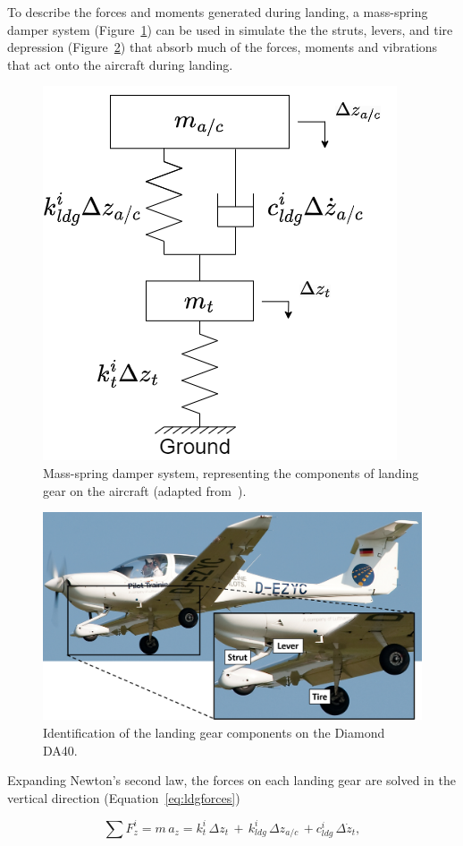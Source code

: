 To describe the forces and moments generated during landing, a mass-spring damper system (Figure~\ref{fig:ldgfbd}) can be used in simulate the the struts, levers, and tire depression (Figure~\ref{fig:ldg}) that absorb much of the forces, moments and vibrations that act onto the aircraft during landing.

\begin{figure}[!ht]\label{fig:ldgfbd}
    \centering
    \includegraphics[width=.4\linewidth]{Figures/ldgfbd.drawio.png}
    \caption{Mass-spring damper system, representing the components of landing gear on the aircraft (adapted from~\cite{xingStrengthAnalysisDiagonal2012}).}
\end{figure}

\begin{figure}[!ht]\label{fig:ldg}
    \centering
    \includegraphics[width=.75\linewidth]{Figures/LandingGear.png}
    \caption{Identification of the landing gear components on the Diamond DA40.}
\end{figure}

Expanding Newton's second law, the forces on each landing gear are solved in the vertical direction (Equation~\ref{eq:ldgforces})

\begin{equation}
    \sum F^i_z = m\,a_z = k^i_t\, \Delta z_t\, + \, k^i_{ldg}\, \Delta z_{a/c}\, + c^i_{ldg}\, \Delta \dot{z}_t,
    \label{eq:ldgforces}
\end{equation}

